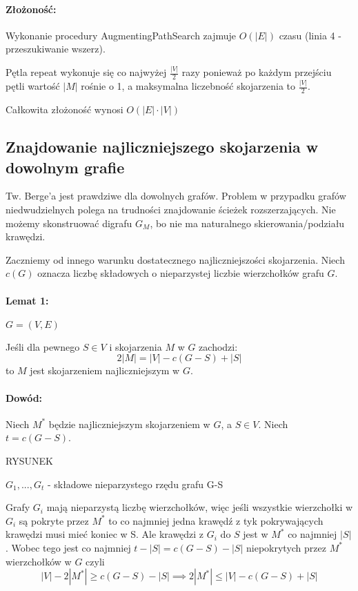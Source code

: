 \paragraph{Złożoność:}
Wykonanie procedury AugmentingPathSearch zajmuje $O(|E|)$ czasu (linia 4 - przeszukiwanie wszerz).

Pętla repeat wykonuje się co najwyżej $\frac{|V|}{2}$ razy ponieważ po każdym przejściu pętli wartość $|M|$ rośnie o 1, a maksymalna liczebność skojarzenia to $\frac{|V|}{2}$. 

Całkowita złożoność wynosi $O(|E| \cdot |V|)$

\subsection{Znajdowanie najliczniejszego skojarzenia w dowolnym grafie}

Tw. Berge'a jest prawdziwe dla dowolnych grafów. Problem w przypadku grafów niedwudzielnych polega na trudności znajdowanie ścieżek rozszerzających. Nie możemy skonstruować digrafu $G_M$, bo nie ma naturalnego skierowania/podziału krawędzi.

Zaczniemy od innego warunku dostatecznego najliczniejszości skojarzenia. Niech $c(G)$ oznacza liczbę składowych o nieparzystej liczbie wierzchołków grafu $G$.

\paragraph{Lemat 1:} $G=(V,E)$

Jeśli dla pewnego $S \in V$ i skojarzenia $M$ w $G$ zachodzi:
$$ 2 |M| = |V|  - c(G-S) + |S|$$ 
to $M$ jest skojarzeniem najliczniejszym w $G$.

\paragraph{Dowód:}

Niech $M^*$ będzie najliczniejszym skojarzeniem w $G$, a $S \in V$. Niech $t = c(G-S)$.

RYSUNEK

$G_1,...,G_t$ - składowe nieparzystego rzędu grafu G-S

Grafy $G_i$ mają nieparzystą liczbę wierzchołków, więc jeśli wszystkie wierzchołki w $G_i$ są pokryte przez $M^*$ to co najmniej jedna krawędź z tyk pokrywających krawędzi musi mieć koniec w S. Ale krawędzi z $G_i$ do $S$ jest w $M^*$ co najmniej $|S|$. Wobec tego jest co najmniej $t-|S| = c(G-S) - |S|$ niepokrytych przez $M^*$ wierzchołków w $G$ czyli 
$$|V|-2|M^*| \geq c(G-S) - |S| \implies 2 |M^*| \leq |V| - c(G-S) + |S|$$

